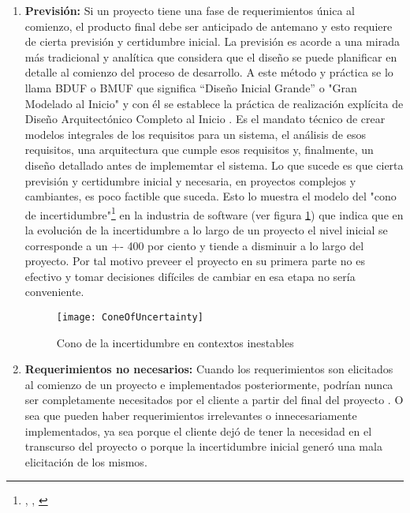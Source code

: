 \begin{enumerate}

\item \textbf{Previsión:} \newline
Si un proyecto tiene una fase de requerimientos única al comienzo, el producto final debe ser anticipado de antemano \cite{Scrum-Institute-2015} y esto requiere de cierta previsión y certidumbre inicial. La previsión es acorde a una mirada más tradicional y analítica que considera que el diseño se puede planificar en detalle al comienzo del proceso de desarrollo. A este método y práctica se lo llama BDUF o BMUF que significa “Diseño Inicial Grande” o "Gran Modelado al Inicio" y con él se establece la práctica de realización explícita de Diseño Arquitectónico Completo al Inicio \cite{Wiley-Sons-2002}. Es el mandato técnico de crear modelos integrales de los requisitos para un sistema, el análisis de esos requisitos, una arquitectura que cumple esos requisitos y, finalmente, un diseño detallado antes de implememtar el sistema. Lo que sucede es que cierta previsión y certidumbre inicial y necesaria, en proyectos complejos y cambiantes, es poco factible que suceda. Esto lo muestra el modelo del "cono de incertidumbre"\footnote{\cite{McConnell-2006}, \cite{Boehm-1981}, \cite{Martin-Alaimo-2014}} en la industria de software (ver figura \ref{fig:ConeOfUncertainty}) que indica que en la evolución de la incertidumbre a lo largo de un proyecto el nivel inicial se corresponde a un +- 400 por ciento y tiende a disminuir a lo largo del proyecto. Por tal motivo preveer el proyecto en su primera parte no es efectivo y tomar decisiones difíciles de cambiar en esa etapa no sería conveniente.

\begin{figure}[h]
  \centering
  \texttt{[image: ConeOfUncertainty]}
  \caption{Cono de la incertidumbre en contextos inestables}
  \centering
  \label{fig:ConeOfUncertainty} %
\end{figure}
\FloatBarrier %

\item \textbf{Requerimientos no necesarios:} \newline
Cuando los requerimientos son elicitados al comienzo de un proyecto e implementados posteriormente, podrían nunca ser completamente necesitados por el cliente a partir del final del proyecto \cite{Scrum-Institute-2015}. O sea que pueden haber requerimientos irrelevantes o innecesariamente implementados, ya sea porque el cliente dejó de tener la necesidad en el transcurso del proyecto o porque la incertidumbre inicial generó una mala elicitación de los mismos.


\end{enumerate}
